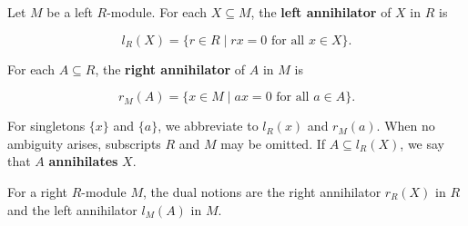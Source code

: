 Let $M$ be a left $R$-module. For each $X \subseteq M$, the \textbf{left annihilator} of $X$ in $R$ is

$$l_R(X) = \{r \in R \mid rx = 0 \text{ for all } x \in X\}.$$

For each $A \subseteq R$, the \textbf{right annihilator} of $A$ in $M$ is

$$r_M(A) = \{x \in M \mid ax = 0 \text{ for all } a \in A\}.$$

For singletons $\{x\}$ and $\{a\}$, we abbreviate to $l_R(x)$ and $r_M(a)$. When no ambiguity arises, subscripts $R$ and $M$ may be omitted. If $A \subseteq l_R(X)$, we say that $A$ \textbf{annihilates} $X$.

For a right $R$-module $M$, the dual notions are the right annihilator $r_R(X)$ in $R$ and the left annihilator $l_M(A)$ in $M$.

